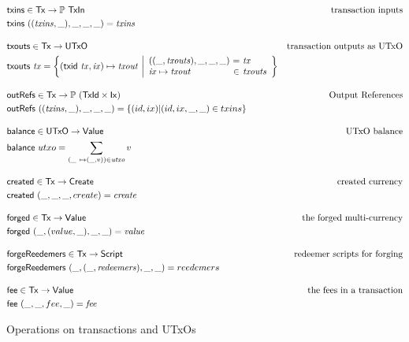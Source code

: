 \documentclass[11pt,a4paper]{article}
\newcommand{\powerset}[1]{\mathbb{P}~#1}
\newcommand{\var}[1]{\mathit{#1}}
\newcommand{\fun}[1]{\mathsf{#1}}
\newcommand{\type}[1]{\mathsf{#1}}
\newcommand{\Script}{\type{Script}}
\newcommand{\TxId}{\type{TxId}}
\newcommand{\Ix}{\type{Ix}}
\newcommand{\Value}{\type{Value}}
\newcommand{\TxIn}{\type{TxIn}}
\newcommand{\UTxO}{\type{UTxO}}
\newcommand{\Create}{\type{Create}}
\newcommand{\Tx}{\type{Tx}}
\begin{document}
\begin{figure}
\begin{align*}
& \fun{txins} \in \Tx \to \powerset{\TxIn}
& \text{transaction inputs} \\
& \fun{txins} ~ ((\var{txins}, \_), \_, \_, \_) = \var{txins}
\\[1em]
& \fun{txouts} \in \Tx \to \UTxO
& \text{transaction outputs as UTxO} \\
& \fun{txouts} ~ \var{tx} =
  \left\{ (\fun{txid} ~ \var{tx}, \var{ix}) \mapsto \var{txout} ~
  \middle| \begin{array}{l@{~}c@{~}l}
             ((\_, \var{txouts}),\_, \_, \_) & = & \var{tx} \\
             \var{ix} \mapsto \var{txout} & \in & \var{txouts}
           \end{array}
  \right\}
\\[1em]
& \fun{outRefs} \in \Tx \to \powerset({\TxId \times \Ix})
& \text{Output References} \\
& \fun{outRefs} ~ ((\var{txins}, \_), \_, \_, \_)
= \left\{ (id, ix) \middle| (id, ix, \_, \_) \in txins\right\}
\\[1em]
& \fun{balance} \in \UTxO \to \Value
& \text{UTxO balance} \\
& \fun{balance} ~ utxo = \sum_{(\_ ~ \mapsto (\_, v)) \in \var{utxo}} v
\\[1em]
& \fun{created} \in \Tx \to \Create
& \text{created currency} \\
& \fun{created} ~ (\_, \_, \_, create) = \var{create}
\\[1em]
& \fun{forged} \in \Tx \to \Value
& \text{the forged multi-currency} \\
& \fun{forged} ~ (\_, (value, \_), \_, \_) = \var{value}
\\[1em]
& \fun{forgeReedemers} \in \Tx \to \Script
& \text{redeemer scripts for forging} \\
& \fun{forgeReedemers} ~ ( \_, (\_, \var{redeemers}), \_, \_) = reedemers
\\[1em]
& \fun{fee} \in \Tx \to \Value
& \text{the fees in a transaction} \\
& \fun{fee} ~ (\_, \_, fee, \_) = \var{fee}
\end{align*}
\caption{Operations on transactions and UTxOs}
\label{fig:auxiliary_ops}
\end{figure}
\end{document}
